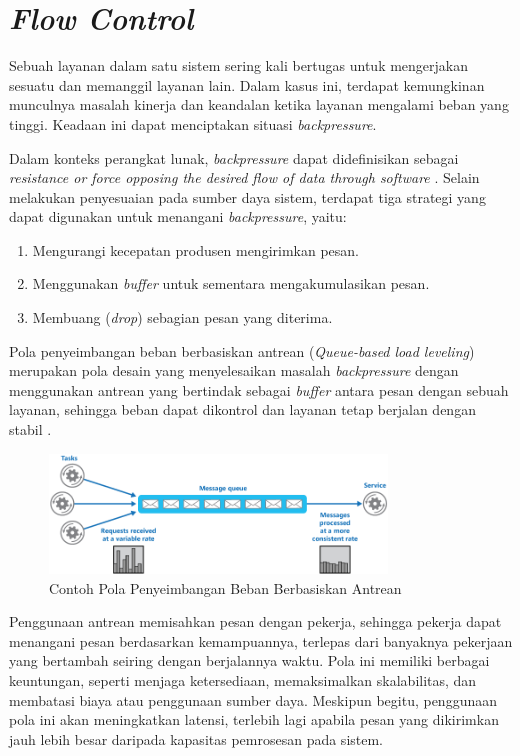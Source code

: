 \section{\textit{Flow Control}}

Sebuah layanan dalam satu sistem sering kali bertugas untuk mengerjakan sesuatu dan memanggil layanan lain. Dalam kasus ini, terdapat kemungkinan munculnya masalah kinerja dan keandalan ketika layanan mengalami beban yang tinggi. Keadaan ini dapat menciptakan situasi \textit{backpressure}.

Dalam konteks perangkat lunak, \textit{backpressure} dapat didefinisikan sebagai \textit{resistance or force opposing the desired flow of data through software} \parencite{backpressureExplained}. Selain melakukan penyesuaian pada sumber daya sistem, terdapat tiga strategi yang dapat digunakan untuk menangani \textit{backpressure}, yaitu:

\begin{enumerate}
    \item Mengurangi kecepatan produsen mengirimkan pesan.
    \item Menggunakan \textit{buffer} untuk sementara mengakumulasikan pesan.
    \item Membuang (\textit{drop}) sebagian pesan yang diterima.
\end{enumerate}

Pola penyeimbangan beban berbasiskan antrean (\textit{Queue-based load leveling}) merupakan pola desain yang menyelesaikan masalah \textit{backpressure} dengan menggunakan antrean yang bertindak sebagai \textit{buffer} antara pesan dengan sebuah layanan, sehingga beban dapat dikontrol dan layanan tetap berjalan dengan stabil \parencite{queueLoadLeveling}.

\begin{figure}[htbp]
    \centering
    \includegraphics[width=0.8\textwidth]{resources/chapter-2/queue-based-load-leveling-pattern.png}
    \caption{Contoh Pola Penyeimbangan Beban Berbasiskan Antrean \parencite{queueLoadLeveling}}
    \label{fig:queue-based-load-leveling-pattern}
\end{figure}

Penggunaan antrean memisahkan pesan dengan pekerja, sehingga pekerja dapat menangani pesan berdasarkan kemampuannya, terlepas dari banyaknya pekerjaan yang bertambah seiring dengan berjalannya waktu. Pola ini memiliki berbagai keuntungan, seperti menjaga ketersediaan, memaksimalkan skalabilitas, dan membatasi biaya atau penggunaan sumber daya. Meskipun begitu, penggunaan pola ini akan meningkatkan latensi, terlebih lagi apabila pesan yang dikirimkan jauh lebih besar daripada kapasitas pemrosesan pada sistem.